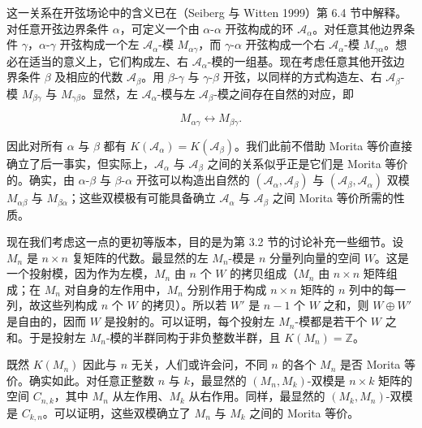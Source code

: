 这一关系在开弦场论中的含义已在（Seiberg 与 Witten 1999）第 6.4 节中解释。对任意开弦边界条件 \(\alpha\)，可定义一个由 \(\alpha\)-\(\alpha\) 开弦构成的环 \({\mathcal A}_{\alpha}\)。对任意其他边界条件 \(\gamma\)，\(\alpha\)-\(\gamma\) 开弦构成一个左 \({\mathcal A}_\alpha\)-模 \(M_{\alpha\gamma}\)，而 \(\gamma\)-\(\alpha\) 开弦构成一个右 \({\mathcal A}_\alpha\)-模 \(M_{\gamma\alpha}\)。想必在适当的意义上，它们构成左、右 \({\mathcal A}_\alpha\)-模的一组基。现在考虑任意其他开弦边界条件 \(\beta\) 及相应的代数 \({\mathcal A}_\beta\)。用 \(\beta\)-\(\gamma\) 与 \(\gamma\)-\(\beta\) 开弦，以同样的方式构造左、右 \({\mathcal A}_\beta\)-模 \(M_{\beta\gamma}\) 与 \(M_{\gamma\beta}\)。显然，左 \({\mathcal A}_\alpha\)-模与左 \({\mathcal A}_\beta\)-模之间存在自然的对应，即

\begin{equation}\tag{4.1}\label{eq:4.1}
M_{\alpha\gamma}\leftrightarrow M_{\beta\gamma}.
\end{equation}

因此对所有 \(\alpha\) 与 \(\beta\) 都有 \(K({\mathcal A}_\alpha)=K({\mathcal A}_\beta)\)。我们此前不借助 Morita 等价直接确立了后一事实，但实际上，\({\mathcal A}_\alpha\) 与 \({\mathcal A}_\beta\) 之间的关系似乎正是它们是 Morita 等价的。确实，由 \(\alpha\)-\(\beta\) 与 \(\beta\)-\(\alpha\) 开弦可以构造出自然的 \(({\mathcal A}_\alpha,{\mathcal A}_\beta)\) 与 \(({\mathcal A}_\beta,{\mathcal A}_\alpha)\) 双模 \(M_{\alpha\beta}\) 与 \(M_{\beta\alpha}\)；这些双模极有可能具备确立 \({\mathcal A}_\alpha\) 与 \({\mathcal A}_\beta\) 之间 Morita 等价所需的性质。

现在我们考虑这一点的更初等版本，目的是为第 3.2 节的讨论补充一些细节。设 \(M_n\) 是 \(n\times n\) 复矩阵的代数。最显然的左 \(M_n\)-模是 \(n\) 分量列向量的空间 \(W\)。这是一个投射模，因为作为左模，\(M_n\) 由 \(n\) 个 \(W\) 的拷贝组成（\(M_n\) 由 \(n\times n\) 矩阵组成；在 \(M_n\) 对自身的左作用中，\(M_n\) 分别作用于构成 \(n\times n\) 矩阵的 \(n\) 列中的每一列，故这些列构成 \(n\) 个 \(W\) 的拷贝）。所以若 \(W'\) 是 \(n-1\) 个 \(W\) 之和，则 \(W\oplus W'\) 是自由的，因而 \(W\) 是投射的。可以证明，每个投射左 \(M_n\)-模都是若干个 \(W\) 之和。于是投射左 \(M_n\)-模的半群同构于非负整数半群，且 \(K(M_n)=\mathbb{Z}\)。

既然 \(K(M_n)\) 因此与 \(n\) 无关，人们或许会问，不同 \(n\) 的各个 \(M_n\) 是否 Morita 等价。确实如此。对任意正整数 \(n\) 与 \(k\)，最显然的 \((M_n,M_k)\)-双模是 \(n\times k\) 矩阵的空间 \(C_{n,k}\)，其中 \(M_n\) 从左作用、\(M_k\) 从右作用。同样，最显然的 \((M_k,M_n)\)-双模是 \(C_{k,n}\)。可以证明，这些双模确立了 \(M_n\) 与 \(M_k\) 之间的 Morita 等价。

